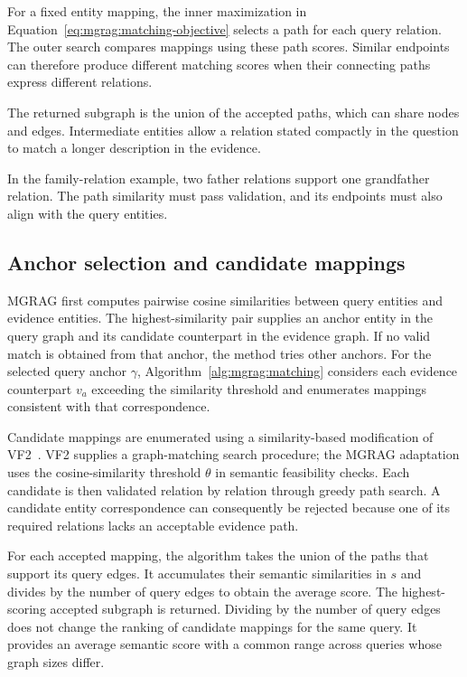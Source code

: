 For a fixed entity mapping, the inner maximization in Equation~\ref{eq:mgrag:matching-objective} selects a path for each query relation. The outer search compares mappings using these path scores. Similar endpoints can therefore produce different matching scores when their connecting paths express different relations.

The returned subgraph is the union of the accepted paths, which can share nodes and edges. Intermediate entities allow a relation stated compactly in the question to match a longer description in the evidence.

In the family-relation example, two father relations support one grandfather relation. The path similarity must pass validation, and its endpoints must also align with the query entities.

\subsection{Anchor selection and candidate mappings}

MGRAG first computes pairwise cosine similarities between query entities and evidence entities. The highest-similarity pair supplies an anchor entity in the query graph and its candidate counterpart in the evidence graph. If no valid match is obtained from that anchor, the method tries other anchors. For the selected query anchor $\gamma$, Algorithm~\ref{alg:mgrag:matching} considers each evidence counterpart $v_a$ exceeding the similarity threshold and enumerates mappings consistent with that correspondence.

Candidate mappings are enumerated using a similarity-based modification of VF2~\cite{mgrag-cordella2004sub}. VF2 supplies a graph-matching search procedure; the MGRAG adaptation uses the cosine-similarity threshold $\theta$ in semantic feasibility checks. Each candidate is then validated relation by relation through greedy path search. A candidate entity correspondence can consequently be rejected because one of its required relations lacks an acceptable evidence path.

For each accepted mapping, the algorithm takes the union of the paths that support its query edges. It accumulates their semantic similarities in $s$ and divides by the number of query edges to obtain the average score. The highest-scoring accepted subgraph is returned. Dividing by the number of query edges does not change the ranking of candidate mappings for the same query. It provides an average semantic score with a common range across queries whose graph sizes differ.

